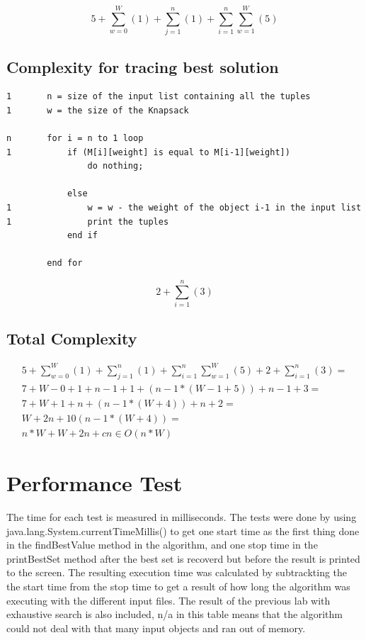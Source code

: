 \documentclass{inc/mas}
\begin{document}
\begin{equation}
 5+\sum^W_{w=0}(1)+\sum^n_{j=1}(1)+\sum^n_{i=1}\sum^W_{w=1}(5)
\end{equation}




\subsection{Complexity for tracing best solution}

\begin{lstlisting}
1		n = size of the input list containing all the tuples
1		w = the size of the Knapsack 

n		for i = n to 1 loop
1			if (M[i][weight] is equal to M[i-1][weight])
				do nothing;
	
			else
1				w = w - the weight of the object i-1 in the input list
1				print the tuples
			end if 
	
		end for
\end{lstlisting}

\begin{equation}
 2+\sum^n_{i=1}(3)
\end{equation}

\subsection{Total Complexity}
\begin{equation}
\begin{split}
 5+\sum^W_{w=0}(1)+\sum^n_{j=1}(1)+\sum^n_{i=1}\sum^W_{w=1}(5)+ 2+\sum^n_{i=1}(3)= \\
7+W-0+1+n-1+1+(n-1*(W-1+5))+n-1+3= \\
7+W+1+n+(n-1*(W+4))+n+2= \\
W+2n+10(n-1*(W+4))= \\
n*W+W+2n+cn \in O(n*W)
\end{split}
\end{equation}


\section{Performance Test}

The time for each test is measured in milliseconds. The tests were done by using java.lang.System.currentTimeMillis() to get one start time as the first thing done in the findBestValue method in the algorithm, and one stop time in the printBestSet method after the best set is recoverd but before the result is printed to the screen. The resulting execution time was calculated by subtrackting the the start time from the stop time to get a result of how long the algorithm was executing with the different input files. The result of the previous lab with exhaustive search is also included, n/a in this table means that the algorithm could not deal with that many input objects and ran out of memory. \\
\end{document}
